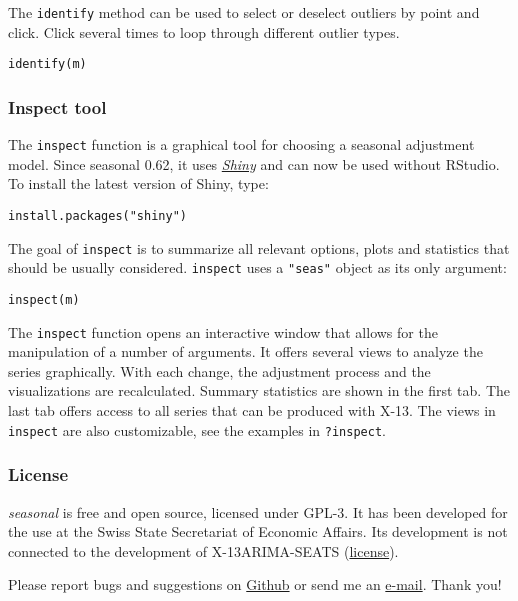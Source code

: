 The \texttt{identify} method can be used to select or deselect outliers
by point and click. Click several times to loop through different
outlier types.

\begin{verbatim}
identify(m)
\end{verbatim}

\subsubsection{Inspect tool}\label{inspect-tool}

The \texttt{inspect} function is a graphical tool for choosing a
seasonal adjustment model. Since seasonal 0.62, it uses
\emph{\href{http://shiny.rstudio.com}{Shiny}} and can now be used
without RStudio. To install the latest version of Shiny, type:

\begin{verbatim}
install.packages("shiny")
\end{verbatim}

The goal of \texttt{inspect} is to summarize all relevant options, plots
and statistics that should be usually considered. \texttt{inspect} uses
a \texttt{"seas"} object as its only argument:

\begin{verbatim}
inspect(m)
\end{verbatim}

The \texttt{inspect} function opens an interactive window that allows
for the manipulation of a number of arguments. It offers several views
to analyze the series graphically. With each change, the adjustment
process and the visualizations are recalculated. Summary statistics are
shown in the first tab. The last tab offers access to all series that
can be produced with X-13. The views in \texttt{inspect} are also
customizable, see the examples in \texttt{?inspect}.

\subsubsection{License}\label{license}

\emph{seasonal} is free and open source, licensed under GPL-3. It has
been developed for the use at the Swiss State Secretariat of Economic
Affairs. Its development is not connected to the development of
X-13ARIMA-SEATS
(\href{https://www.census.gov/srd/www/disclaimer.html}{license}).

Please report bugs and suggestions on
\href{https://github.com/christophsax/seasonal}{Github} or send me an
\href{mailto:christoph.sax@gmail.com}{e-mail}. Thank you!
